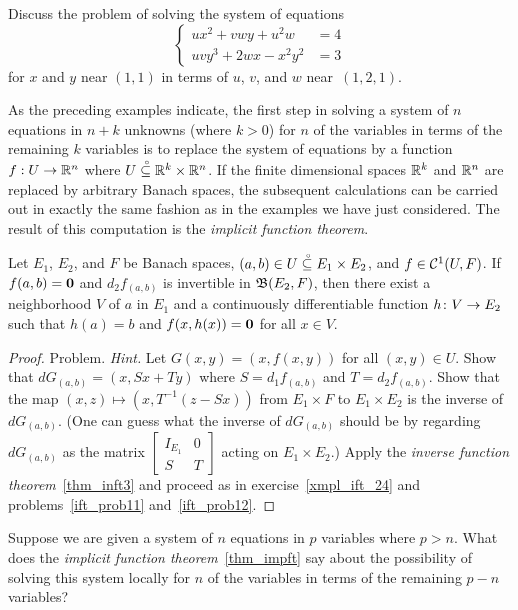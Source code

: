 \begin{prob}\label{ift_prob12} Discuss the problem of solving the system of equations
  \begin{equation}
     \begin{cases}
          ux^2 + vwy + u^2w &= 4 \\
         uvy^3 + 2wx - x^2y^2 &= 3
     \end{cases}
  \end{equation}
for $x$ and $y$ near $(1,1)$ in terms of $u$, $v$, and $w$ near~$(1,2,1)$.
\end{prob}

As the preceding examples indicate, the first step in solving a system of $n$ equations in
$n+k$ unknowns (where $k>0$) for $n$ of the variables in terms of the remaining $k$ variables
is to replace the system of equations by a function $f:U \rightarrow \mathbb{R}^n$ where $U\overset{\thickspace{}_\circ}{\subseteq}\mathbb{R}^k \times
\mathbb{R}^n$. If the finite dimensional spaces $\mathbb{R}^k$ and $\mathbb{R}^n$ are replaced by arbitrary Banach
spaces, the subsequent calculations can be carried out in exactly the same fashion as in the
examples we have just considered.  The result of this computation is the \emph{implicit
function theorem}.

\begin{thm}\label{thm_impft}  Let $E_1$, $E_2$, and $F$ be Banach
spaces, $(a,b) \in U\overset{\thickspace{}_\circ}{\subseteq}E_1 \times E_2$, and $f \in \mathcal{C}^1(U,F)$. If $f(a,b) = \mathbf{0}$
and $d_2f_{(a,b)}$ is invertible in $\mathfrak{B}(E_2,F)$, then there exist a neighborhood $V$ of
$a$ in $E_1$ and a continuously differentiable function $h \colon V \rightarrow E_2$ such that $h(a)
= b$ and $f(x,h(x)) = \mathbf{0}$ for all $x \in V$.
\end{thm}

\begin{proof} Problem.  \emph{Hint.} Let $G(x,y) = (x,f(x,y))$ for all $(x,y) \in U$. Show that
$dG_{(a,b)} = (x, Sx + Ty)$ where $S = d_1f_{(a,b)}$ and $T = d_2f_{(a,b)}$.  Show that the
map $(x,z) \mapsto (x,T^{-1}(z-Sx))$ from $E_1 \times F$ to $E_1 \times E_2$ is the inverse of
$dG_{(a,b)}$.  (One can guess what the inverse of $dG_{(a,b)}$ should be by regarding
$dG_{(a,b)}$ as the matrix $\begin{bmatrix}
                                 I_{E_1} & 0 \\
                                    S    & T
                            \end{bmatrix}$ acting on $E_1 \times E_2$.) Apply the \emph{inverse
function theorem}~\ref{thm_inft3} and proceed as in exercise~\ref{xmpl_ift_24} and
problems~\ref{ift_prob11} and~\ref{ift_prob12}.    \ns
\end{proof}

\begin{prob} Suppose we are given a system of $n$ equations in $p$ variables where $p > n$. What
does the \emph{implicit function theorem}~\ref{thm_impft} say about the possibility of solving
this system locally for $n$ of the variables in terms of the remaining $p - n$ variables?
\end{prob}


\endinput
